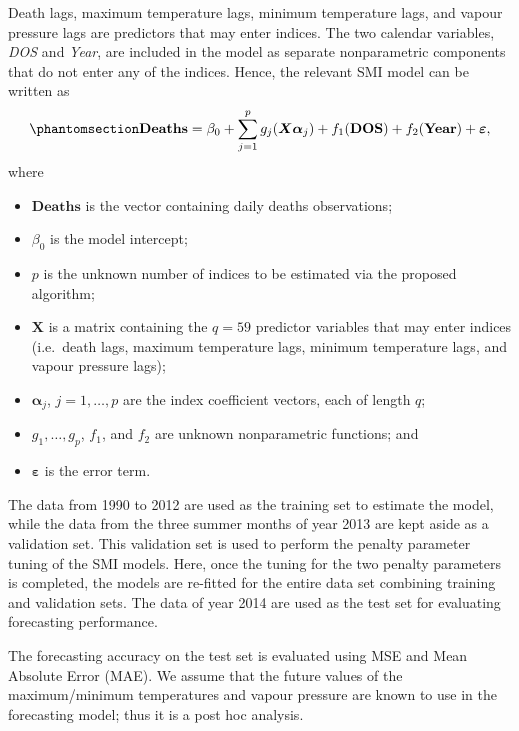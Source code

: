 \documentclass[
  11pt,
  a4paper,
]{article}
\providecommand{\tightlist}{%
  \setlength{\itemsep}{0pt}\setlength{\parskip}{0pt}}\usepackage{longtable,booktabs,array}
\begin{document}
Death lags, maximum temperature lags, minimum temperature lags, and
vapour pressure lags are predictors that may enter indices. The two
calendar variables, \emph{DOS} and \emph{Year}, are included in the
model as separate nonparametric components that do not enter any of the
indices. Hence, the relevant SMI model can be written as
\begin{equation}\phantomsection\label{eq-heat}{
  \textbf{Deaths} = \beta_{0} + \sum_{j = 1}^{p}{g_{j}(\bm{X}\bm{\alpha}_{j})} + f_{1}(\textbf{DOS}) + f_{2}(\textbf{Year})+ \bm{\varepsilon},
}\end{equation} where

\begin{itemize}
\tightlist
\item
  \(\textbf{Deaths}\) is the vector containing daily deaths
  observations;
\item
  \(\beta_{0}\) is the model intercept;
\item
  \(p\) is the unknown number of indices to be estimated via the
  proposed algorithm;
\item
  \(\bm{X}\) is a matrix containing the \(q=59\) predictor variables
  that may enter indices (i.e.~death lags, maximum temperature lags,
  minimum temperature lags, and vapour pressure lags);
\item
  \(\bm{\alpha}_{j}\), \(j = 1, \dots, p\) are the index coefficient
  vectors, each of length \(q\);
\item
  \(g_{1}, \dots,g_p\), \(f_{1}\), and \(f_{2}\) are unknown
  nonparametric functions; and
\item
  \(\bm{\varepsilon}\) is the error term.
\end{itemize}

The data from 1990 to 2012 are used as the training set to estimate the
model, while the data from the three summer months of year 2013 are kept
aside as a validation set. This validation set is used to perform the
penalty parameter tuning of the SMI models. Here, once the tuning for
the two penalty parameters is completed, the models are re-fitted for
the entire data set combining training and validation sets. The data of
year 2014 are used as the test set for evaluating forecasting
performance.

The forecasting accuracy on the test set is evaluated using MSE and Mean
Absolute Error (MAE). We assume that the future values of the
maximum/minimum temperatures and vapour pressure are known to use in the
forecasting model; thus it is a post hoc analysis.
\end{document}
